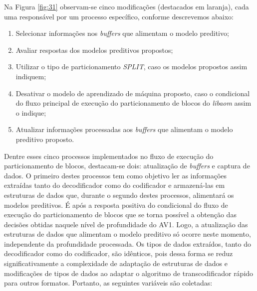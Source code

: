 Na Figura \ref{fig:31} observam-se cinco modificações (destacados em laranja), cada uma responsável por um processo específico, conforme descrevemos abaixo:

\begin{enumerate}[1.]
    \item Selecionar informações nos \textit{buffers} que alimentam o modelo preditivo;

    \item Avaliar respostas dos modelos preditivos propostos;

    \item Utilizar o tipo de particionamento \textit{SPLIT}, caso os modelos propostos assim indiquem;

    \item Desativar o modelo de aprendizado de máquina proposto, caso o condicional do fluxo principal de execução do particionamento de blocos do \textit{libaom} assim o indique;

    \item Atualizar informações processadas aos \textit{buffers} que alimentam o modelo preditivo proposto.
\end{enumerate}

Dentre esses cinco processos implementados no fluxo de execução do particionamento de blocos, destacam-se dois: atualização de \textit{buffers} e captura de dados. O primeiro destes processos tem como objetivo ler as informações extraídas tanto do decodificador como do codificador e armazená-las em estruturas de dados que, durante o segundo destes processos, alimentará os modelos preditivos. É após a resposta positiva do condicional do fluxo de execução do particionamento de blocos que se torna possível a obtenção das decisões obtidas naquele nível de profundidade do AV1. Logo, a atualização das estruturas de dados que alimentam o modelo preditivo só ocorre neste momento, independente da profundidade processada. Os tipos de dados extraídos, tanto do decodificador como do codificador, são idênticos, pois dessa forma se reduz significativamente a complexidade de adaptação de estruturas de dados e modificações de tipos de dados ao adaptar o algoritmo de transcodificador rápido para outros formatos. Portanto, as seguintes variáveis são coletadas:

